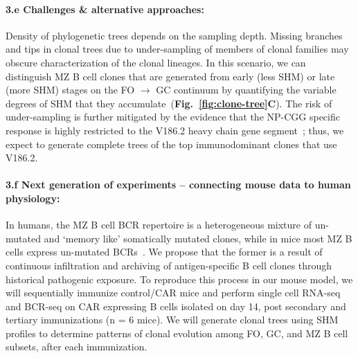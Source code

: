 \documentclass[11pt]{article}
\newcommand{\para}[1]{\vspace*{-4.5mm}\paragraph{#1}}
\begin{document}


\para{{3.e Challenges \& alternative approaches:}}
Density of phylogenetic trees depends on the sampling depth.
Missing branches and tips in  clonal trees due to under-sampling of  members of clonal families may obscure characterization of the clonal lineages.
In this scenario, we can distinguish MZ B cell clones that are generated from early (less SHM) or late (more SHM) stages on the FO $\rightarrow$ GC continuum by quantifying the variable degrees of SHM that they accumulate~(\textbf{Fig.~\ref{fig:clone-tree}C}).
The risk of under-sampling is further mitigated by the evidence that the NP-CGG specific response is highly restricted to the V186.2 heavy chain gene segment~\cite{Bothwell_1981, Bothwell_1982}; thus, we expect to generate complete trees of the top immunodominant clones that use V186.2. %



\para{{3.f Next generation of experiments --  connecting mouse data to human physiology:}}
In humans, the MZ B cell BCR repertoire is a heterogeneous mixture of un-mutated and `memory like' somatically mutated clones, while in mice most MZ B cells express un-mutated BCRs~\cite{Kibler_2021, Weller_2004, Cerutti_2013, Pillai_2005}.
We propose that the former is a result of continuous infiltration and archiving of antigen-specific B cell clones through historical pathogenic exposure.
To reproduce this process in our mouse model, we will sequentially immunize control/CAR mice and perform  single cell RNA-seq and BCR-seq on CAR expressing B cells isolated on day 14, post secondary and tertiary immunizations (n = 6 mice). %
We will generate clonal trees using SHM profiles to determine patterns of clonal evolution among FO, GC, and MZ B cell subsets, after each immunization.
\end{document}
